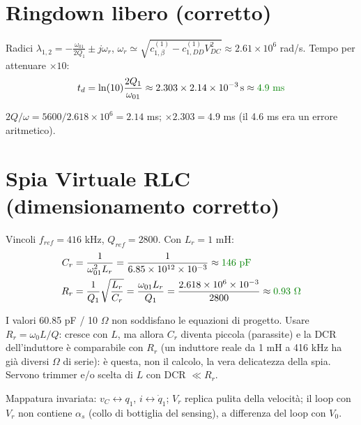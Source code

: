 \documentclass[11pt,a4paper]{article}
\begin{document}
\section{Ringdown libero (corretto)}
Radici $\lambda_{1,2}=-\frac{\omega_{01}}{2Q_1}\pm j\omega_r$, $\omega_r\simeq\sqrt{c_{1,\beta}^{(1)}-c_{1,DD}^{(1)}V_{DC}^2}\approx2.61\times10^6$ rad/s. Tempo per attenuare $\times10$:
\begin{equation}
    t_d=\ln(10)\frac{2Q_1}{\omega_{01}}
    \approx2.303\times2.14\times10^{-3}\,\mathrm{s}
    \approx\textcolor{green!50!black}{4.9\ \mathrm{ms}}
\end{equation}
\begin{corrbox}[Correzione 4] $2Q/\omega=5600/2.618\times10^6=2.14$ ms; $\times2.303=4.9$ ms (il 4.6 ms era un errore aritmetico). \end{corrbox}

\section{Spia Virtuale RLC (dimensionamento corretto)}
Vincoli $f_{ref}=416$ kHz, $Q_{ref}=2800$. Con $L_r=1$ mH:
\begin{align}
    C_r&=\frac{1}{\omega_{01}^2L_r}=\frac{1}{6.85\times10^{12}\times10^{-3}}
    \approx\textcolor{green!50!black}{146\ \mathrm{pF}}\\
    R_r&=\frac{1}{Q_1}\sqrt{\frac{L_r}{C_r}}=\frac{\omega_{01}L_r}{Q_1}
    =\frac{2.618\times10^{6}\times10^{-3}}{2800}
    \approx\textcolor{green!50!black}{0.93\ \Omega}
\end{align}
\begin{corrbox}
I valori 60.85 pF / 10 $\Omega$ non soddisfano le equazioni di progetto. Usare $R_r=\omega_0 L/Q$: cresce con $L$, ma allora $C_r$ diventa piccola (parassite) e la DCR dell'induttore \`e comparabile con $R_r$ (un induttore reale da 1 mH a 416 kHz ha gi\`a diversi $\Omega$ di serie): \`e questa, non il calcolo, la vera delicatezza della spia. Servono trimmer e/o scelta di $L$ con DCR $\ll R_r$.
\end{corrbox}
Mappatura invariata: $v_C\leftrightarrow q_1$, $i\leftrightarrow\dot q_1$; $V_r$ replica pulita della velocit\`a; il loop con $V_r$ non contiene $\alpha_s$ (collo di bottiglia del sensing), a differenza del loop con $V_0$.
\end{document}

